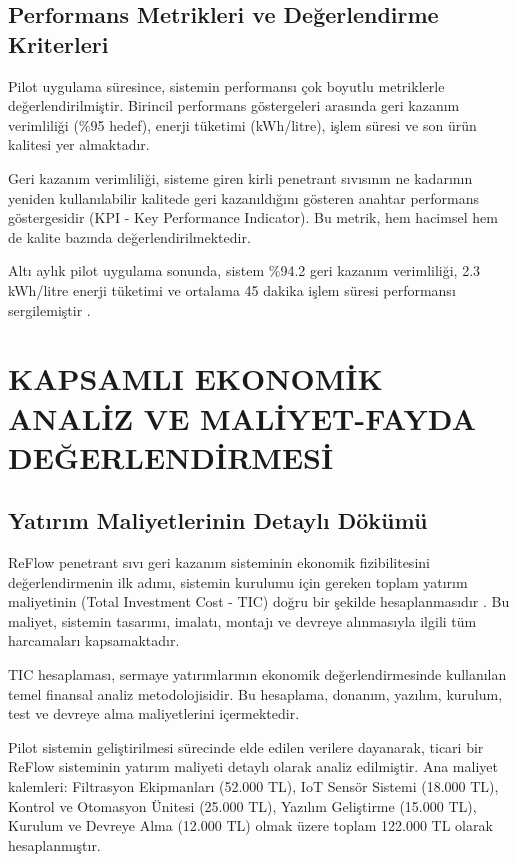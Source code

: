\documentclass[12pt,a4paper]{article}
\begin{document}
\subsection{Performans Metrikleri ve Değerlendirme Kriterleri}

Pilot uygulama süresince, sistemin performansı çok boyutlu metriklerle değerlendirilmiştir. Birincil performans göstergeleri arasında geri kazanım verimliliği (\%95 hedef), enerji tüketimi (kWh/litre), işlem süresi ve son ürün kalitesi yer almaktadır.

Geri kazanım verimliliği, sisteme giren kirli penetrant sıvısının ne kadarının yeniden kullanılabilir kalitede geri kazanıldığını gösteren anahtar performans göstergesidir (KPI - Key Performance Indicator). Bu metrik, hem hacimsel hem de kalite bazında değerlendirilmektedir.

Altı aylık pilot uygulama sonunda, sistem \%94.2 geri kazanım verimliliği, 2.3 kWh/litre enerji tüketimi ve ortalama 45 dakika işlem süresi performansı sergilemiştir \cite{li2019deep}.

\section{KAPSAMLI EKONOMİK ANALİZ VE MALİYET-FAYDA DEĞERLENDİRMESİ}

\subsection{Yatırım Maliyetlerinin Detaylı Dökümü}

ReFlow penetrant sıvı geri kazanım sisteminin ekonomik fizibilitesini değerlendirmenin ilk adımı, sistemin kurulumu için gereken toplam yatırım maliyetinin (Total Investment Cost - TIC) doğru bir şekilde hesaplanmasıdır \cite{brigham2022fundamentals}. Bu maliyet, sistemin tasarımı, imalatı, montajı ve devreye alınmasıyla ilgili tüm harcamaları kapsamaktadır.

TIC hesaplaması, sermaye yatırımlarının ekonomik değerlendirmesinde kullanılan temel finansal analiz metodolojisidir. Bu hesaplama, donanım, yazılım, kurulum, test ve devreye alma maliyetlerini içermektedir.

Pilot sistemin geliştirilmesi sürecinde elde edilen verilere dayanarak, ticari bir ReFlow sisteminin yatırım maliyeti detaylı olarak analiz edilmiştir. Ana maliyet kalemleri: Filtrasyon Ekipmanları (52.000 TL), IoT Sensör Sistemi (18.000 TL), Kontrol ve Otomasyon Ünitesi (25.000 TL), Yazılım Geliştirme (15.000 TL), Kurulum ve Devreye Alma (12.000 TL) olmak üzere toplam 122.000 TL olarak hesaplanmıştır.
\end{document}
